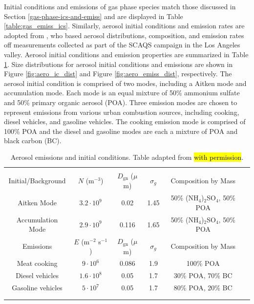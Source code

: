 Initial conditions and emissions of gas phase species match those discussed in Section \ref{gas-phase-ics-and-emiss} and are displayed in Table \ref{table:gas_emiss_ics}. Similarly, aerosol initial conditions and emission rates are adopted from \cite{riemer_simulating_2009}, who based aerosol distributions, composition, and emission rates off measurements collected as part of the SCAQS campaign in the Los Angeles valley. Aerosol initial conditions and emission properties are summarized in Table \ref{table:aero_emiss_ics}. Size distributions for aerosol initial conditions and emissions are shown in Figure \ref{fig:aero_ic_dist} and Figure \ref{fig:aero_emiss_dist}, respectively. The aerosol initial condition is comprised of two modes, including a Aitken mode and accumulation mode. Each mode is an equal mixture of 50\% ammonium sulfate and 50\% primary organic aerosol (POA). Three emission modes are chosen to represent emissions from various urban combustion sources, including cooking, diesel vehicles, and gasoline vehicles. The cooking emission mode is comprised of 100\% POA and the diesel and gasoline modes are each a mixture of POA and black carbon (BC). 

\begin{table}[h]
\centering
\caption{Aerosol emissions and initial conditions. Table adapted from \cite{riemer_simulating_2009} \hl{with permission}.}
\begin{tabular*}{\linewidth}{@{\extracolsep{\fill}} cccccc}
\\[-2ex]\hline 
     \hline \\[-2ex] Initial/Background  & $N$ (m$^{-3}$) & $D_{\text{gn}}$ ($\mu$m) & $\sigma_g$ & Composition by Mass\\
 \midrule
Aitken Mode & $3.2 \cdot 10^9$ & 0.02 & 1.45 & 50\% (NH$_4$)$_2$SO$_4$, 50\% POA\\
Accumulation Mode & $2.9 \cdot 10^9$ & 0.116 & 1.65 & 50\% (NH$_4$)$_2$SO$_4$, 50\% POA\\
\midrule
Emissions & $E$ (m$^{-2}$ s$^{-1}$) & $D_{\text{gn}}$ ($\mu$m) & $\sigma_g$ & Composition by Mass\\
\midrule
Meat cooking & $9 \cdot 10^6$ & 0.086 & 1.9 & 100\% POA\\
Diesel vehicles & $1.6 \cdot 10^8$ & 0.05 & 1.7 & 30\% POA, 70\% BC \\
Gasoline vehicles & $5 \cdot 10^7$ & 0.05 & 1.7 & 80\% POA, 20\% BC \\
\\[-2ex]\hline 
     \hline \\[-2ex]
\end{tabular*}
\label{table:aero_emiss_ics}
\end{table}

